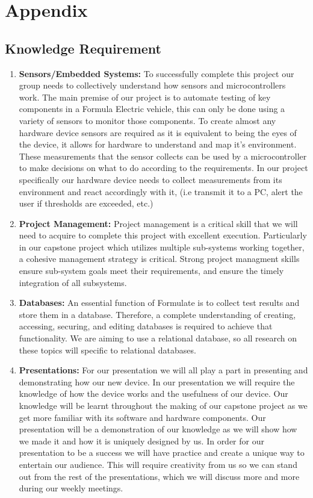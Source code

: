 \documentclass[12pt]{article}
\begin{document}
\newpage

\section{Appendix}

\subsection{Knowledge Requirement}
\begin{enumerate}
  \item \textbf{Sensors/Embedded Systems:} To successfully complete this project our group needs to collectively understand how sensors and microcontrollers work. The main premise of our project is to automate testing of key components in a Formula Electric vehicle, this can only be done using a variety of sensors to monitor those components. To create almost any hardware device sensors are required as it is equivalent to being the eyes of the device, it allows for hardware to understand and map it's environment. These measurements that the sensor collects can be used by a microcontroller to make decisions on what to do according to the requirements. In our project specifically our hardware device needs to collect measurements from its environment and react accordingly with it, (i.e transmit it to a PC, alert the user if thresholds are exceeded, etc.)
  
  \item \textbf{Project Management:} Project management is a critical skill that we will need to acquire to complete this project with excellent execution. Particularly in our capstone project which utilizes multiple sub-systems working together, a cohesive management strategy is critical. Strong project managment skills ensure sub-system goals meet their requirements, and ensure the timely integration of all subsystems.
  
  \item \textbf{Databases:} An essential function of Formulate is to collect test results and store them in a database. Therefore, a complete understanding of creating, accessing, securing, and editing databases is required to achieve that functionality. We are aiming to use a relational database, so all research on these topics will specific to relational databases.
  
  \item \textbf{Presentations:} For our presentation we will all play a part in presenting and demonstrating how our new device. In our presentation we will require the knowledge of how the device works and the usefulness of our device. Our knowledge will be learnt throughout the making of our capstone project as we get more familiar with its software and hardware components. Our presentation will be a demonstration of our knowledge as we will show how we made it and how it is uniquely designed by us. In order for our presentation to be a success we will have practice and create a unique way to entertain our audience. This will require creativity from us so we can stand out from the rest of the presentations, which we will discuss more and more during our weekly meetings.
  
\end{enumerate}
\end{document}
